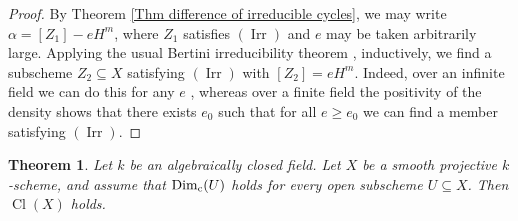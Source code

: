 \documentclass[11pt]{amsart}
\newtheorem{Thm}{Theorem}[section]              %
\theoremstyle{definition}
\newcommand{\cs}{_{\text{\normalfont c}}}
\newcommand{\Dim}{\operatorname{Dim}}
\newcommand{\Cl}{\operatorname{Cl}}
\newcommand{\Irr}{\operatorname{Irr}}
\begin{document}
\begin{proof}
By Theorem \ref{Thm difference of irreducible cycles}, we may write
$\alpha = [Z_1] - eH^m$, where $Z_1$ satisfies $(\Irr)$ and $e$ may
be taken arbitrarily large. Applying the usual Bertini
irreducibility theorem \cite[Theorem~6.10(4)]{JouBer},
\cite[Corollary~1.4]{ChaPoo} inductively, we find a subscheme $Z_2
\subseteq X$ satisfying $(\Irr)$ with $[Z_2] = eH^m$. Indeed, over
an infinite field we can do this for any $e$
\cite[Theorem~6.10(4)]{JouBer}, whereas over a finite field the
positivity of the density \cite[Corollary~1.4]{ChaPoo} shows that there
exists $e_0$ such that for all $e \geq e_0$ we can find a member
satisfying $(\Irr)$.
\end{proof}

\begin{Thm}\label{Thm cycle class map}
Let $k$ be an algebraically closed field. Let $X$ be a smooth
projective $k$-scheme, and assume that $\Dim\cs(U)$ holds for every
open subscheme $U \subseteq X$. Then $\Cl(X)$ holds.
\end{Thm}
\end{document}
